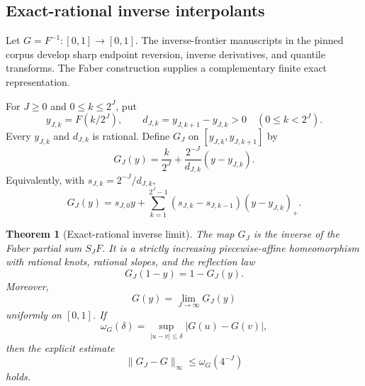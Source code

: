 \documentclass[11pt,oneside]{article}
\newtheorem{theorem}{Theorem}[section]
\theoremstyle{definition}
\begin{document}
\subsection{Exact-rational inverse interpolants}

Let $G=F^{-1}:[0,1]\to[0,1]$.  The inverse-frontier manuscripts in the
pinned corpus develop sharp endpoint reversion, inverse derivatives, and
quantile transforms.  The Faber construction supplies a complementary
finite exact representation.

For $J\ge0$ and $0\le k\le2^J$, put
\begin{equation}
 y_{J,k}=F(k/2^J),
 \qquad
 d_{J,k}=y_{J,k+1}-y_{J,k}>0
 \quad(0\le k<2^J).                                  \label{p5:eq:inverse-knots}
\end{equation}
Every $y_{J,k}$ and $d_{J,k}$ is rational.  Define $G_J$ on
$[y_{J,k},y_{J,k+1}]$ by
\begin{equation}
 G_J(y)=\frac{k}{2^J}
 +\frac{2^{-J}}{d_{J,k}}(y-y_{J,k}).                   \label{p5:eq:inverse-piecewise}
\end{equation}
Equivalently, with $s_{J,k}=2^{-J}/d_{J,k}$,
\begin{equation}
 G_J(y)=s_{J,0}y+
 \sum_{k=1}^{2^J-1}(s_{J,k}-s_{J,k-1})(y-y_{J,k})_+.  \label{p5:eq:inverse-hinge}
\end{equation}

\begin{theorem}[Exact-rational inverse limit]
\label{p5:thm:inverse-faber-limit}
The map $G_J$ is the inverse of the Faber partial sum $S_JF$.  It is a
strictly increasing piecewise-affine homeomorphism with rational knots,
rational slopes, and the reflection law
\begin{equation}
 G_J(1-y)=1-G_J(y).                                      \label{p5:eq:inverse-interpolant-symmetry}
\end{equation}
Moreover,
\begin{equation}
 \boxed{\displaystyle
 G(y)=\lim_{J\to\infty}G_J(y)}                       \label{p5:eq:inverse-faber-limit}
\end{equation}
uniformly on $[0,1]$.  If
\begin{equation}
 \omega_G(\delta)=
 \sup_{|u-v|\le\delta}|G(u)-G(v)|,                  \label{p5:eq:inverse-modulus}
\end{equation}
then the explicit estimate
\begin{equation}
 \boxed{\displaystyle
 \|G_J-G\|_\infty\le\omega_G(4^{-J})}             \label{p5:eq:inverse-faber-error}
\end{equation}
holds.
\end{theorem}
\end{document}
